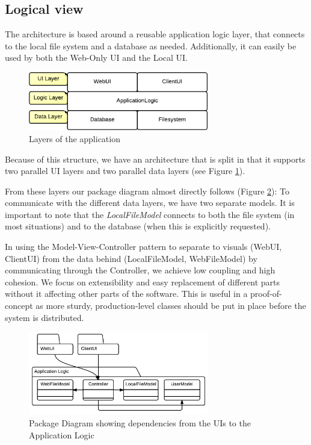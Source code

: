 \subsection{Logical view}
\label{sec:logicalview}

The architecture is based around a reusable application logic layer, that connects to the
local file system and a database as needed. Additionally, it can easily be used by
both the Web-Only UI and the Local UI.

\begin{figure}[htb]
	\centering
	\includegraphics[width=0.7\textwidth]{Software_architecture/graphics/application-layers.png}
	\caption{Layers of the application}
	\label{fig:application-layers}
\end{figure}

Because of this structure, we have an architecture that is split in that it supports two
parallel UI layers and two parallel data layers (see Figure \ref{fig:application-layers}).

From these layers our package diagram almost directly follows (Figure \ref{fig:package-diagram}):
To communicate with the different data layers, we have two separate models. It is important to
note that the \emph{LocalFileModel} connects to both the file system (in most situations) and
to the database (when this is explicitly requested).

In using the Model-View-Controller pattern to separate to visuals (WebUI, ClientUI) from the
data behind (LocalFileModel, WebFileModel) by communicating through the Controller, we achieve
low coupling and high cohesion. We focus on extensibility and easy replacement of different
parts without it affecting other parts of the software. This is useful in a proof-of-concept as
more sturdy, production-level classes should be put in place before the system is distributed.

\begin{figure}[htb]
	\centering
	\includegraphics[width=0.7\textwidth]{Software_architecture/graphics/package-diagram.png}
	\caption{Package Diagram showing dependencies from the UIs to the Application Logic}
	\label{fig:package-diagram}
\end{figure}

